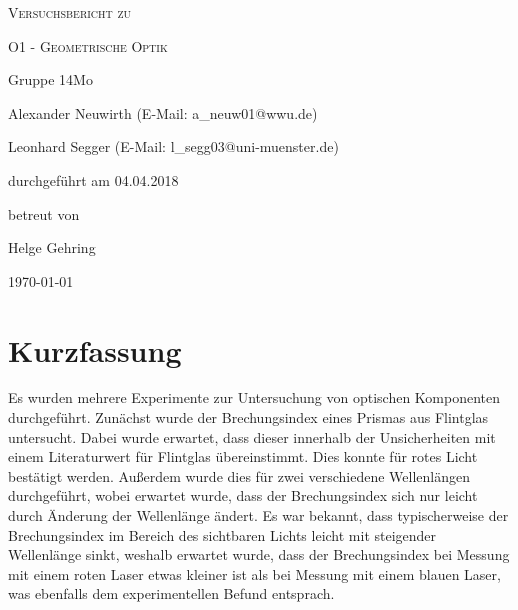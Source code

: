 \documentclass[
	a4paper,
	12pt,
	pagesize,
	ngerman
]{scrartcl}
\begin{document}
	
	\begin{titlepage}
		\centering
		{\scshape\LARGE Versuchsbericht zu \par}
		\vspace{1cm}
		{\scshape\huge O1 - Geometrische Optik \par}
		\vspace{2.5cm}
		{\LARGE Gruppe 14Mo \par}
		\vspace{0.5cm}
		
		{\large Alexander Neuwirth (E-Mail: a\_neuw01@wwu.de) \par}
		{\large Leonhard Segger (E-Mail: l\_segg03@uni-muenster.de) \par}
		\vfill
		
		durchgeführt am 04.04.2018\par
		betreut von\par
		{\large Helge Gehring} 
		
		\vfill
		
		{\large \today\par}
	\end{titlepage}
	\tableofcontents
	\newpage


	\section{Kurzfassung}
	Es wurden mehrere Experimente zur Untersuchung von optischen Komponenten durchgeführt.
	Zunächst wurde der Brechungsindex eines Prismas aus Flintglas untersucht.
	Dabei wurde erwartet, dass dieser innerhalb der Unsicherheiten mit einem Literaturwert für Flintglas übereinstimmt.
	Dies konnte für rotes Licht bestätigt werden.
	Außerdem wurde dies für zwei verschiedene Wellenlängen durchgeführt, wobei erwartet wurde, dass der Brechungsindex sich nur leicht durch Änderung der Wellenlänge ändert.
	Es war bekannt, dass typischerweise der Brechungsindex im Bereich des sichtbaren Lichts leicht mit steigender Wellenlänge sinkt, weshalb erwartet wurde, dass der Brechungsindex bei Messung mit einem roten Laser etwas kleiner ist als bei Messung mit einem blauen Laser, was ebenfalls dem experimentellen Befund entsprach.
	
\end{document}
